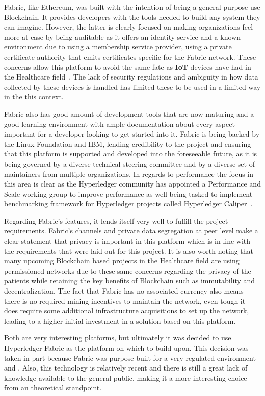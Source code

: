 Fabric, like Ethereum, was built with the intention of being a general purpose
use Blockchain. It provides developers with the tools needed to build any
system they can imagine. However, the latter is clearly focused on making
organizations feel more at ease by being auditable as it offers an identity
service and a known environment due to using a membership service provider,
using a private certificate authority that emits certificates specific for the
Fabric network. These concerns allow this platform to avoid the same fate as
\textbf{IoT} devices have had in the Healthcare field~\cite{Tana2017}. The lack
of security regulations and ambiguity in how data collected by these devices is
handled has limited these to be used in a limited way in the this context.

Fabric also has good amount of development tools that are now maturing and a
good learning environment with ample documentation about every aspect important
for a developer looking to get started into it. Fabric is being backed by the
Linux Foundation and IBM, lending credibility to the project and ensuring that
this platform is supported and developed into the foreseeable future, as it is
being governed by a diverse technical steering committee and by a diverse set
of maintainers from multiple organizations. In regards to performance the focus
in this area is clear as the Hyperledger community has appointed a Performance
and Scale working group to improve performance as well being tasked to
implement benchmarking framework for Hyperledger projects called Hyperledger
Caliper~\cite{performanceScale2017}.

Regarding Fabric's features, it lends itself very well to fulfill the project
requirements. Fabric's channels and private data segregation at peer level make
a clear statement that privacy is important in this platform which is in line
with the requirements that were laid out for this project. It is also worth
noting that many upcoming Blockchain based projects in the Healthcare field are
using permissioned networks due to these same concerns regarding the privacy of
the patients while retaining the key benefits of Blockchain such as
immutability and decentralization. The fact that Fabric has no associated
currency also means there is no required mining incentives to maintain the
network, even tough it does require some additional infrastructure acquisitions
to set up the network, leading to a higher initial investment in a solution
based on this platform.

Both are very interesting platforms, but ultimately it was decided to use
Hyperledger Fabric as the platform on which to build upon. This decision was
taken in part because Fabric was purpose built for a very regulated environment
and . Also, this technology is relatively recent and there is still a great
lack of knowledge available to the general public, making it a more interesting
choice from an theoretical standpoint.


